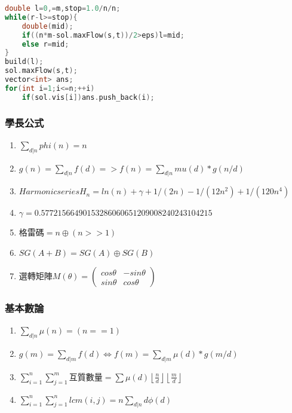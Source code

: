 \begin{lstlisting}[language=C++]
double l=0,=m,stop=1.0/n/n;
while(r-l>=stop){
	double(mid);
	if((n*m-sol.maxFlow(s,t))/2>eps)l=mid;
	else r=mid;
}
build(l);
sol.maxFlow(s,t);
vector<int> ans;
for(int i=1;i<=n;++i)
	if(sol.vis[i])ans.push_back(i);
\end{lstlisting}


\subsubsection{學長公式}
\begin{enumerate}\itemsep = -3pt
\item $\sum_{d|n} phi(n) = n$
\item $g(n) = \sum_{d|n} f(d) => f(n) = \sum_{d|n} mu(d)*g(n/d)$
\item $Harmonic series H_n = ln(n) + \gamma + 1/(2n) - 1/(12n^2) + 1/(120n^4)$
\item $ \gamma = 0.57721566490153286060651209008240243104215$
\item 格雷碼$=n\oplus (n>>1)$
\item $SG(A+B)=SG(A)\oplus SG(B)$
\item 選轉矩陣$M(\theta)= \left( \begin{array}{ccc}
cos\theta & -sin\theta \\ 
sin\theta &  cos\theta
\end{array} \right)$
\end{enumerate}

\subsubsection{基本數論}
\begin{enumerate}\itemsep = -3pt
	\item $\sum_{d|n} \mu (n)=(n==1)$
	\item $g(m)=\sum_{d|m}f(d)\Leftrightarrow f(m)=\sum_{d|m}\mu (d)*g(m/d)$
	\item $\sum_{i=1}^n\sum_{j=1}^m$互質數量$=\sum \mu (d)\left \lfloor \frac{n}{d} \right \rfloor \left \lfloor \frac{m}{d} \right \rfloor$
	\item $\sum_{i=1}^n\sum_{j=1}^nlcm(i,j)=n\sum_{d|n}d\phi (d)$
\end{enumerate}


